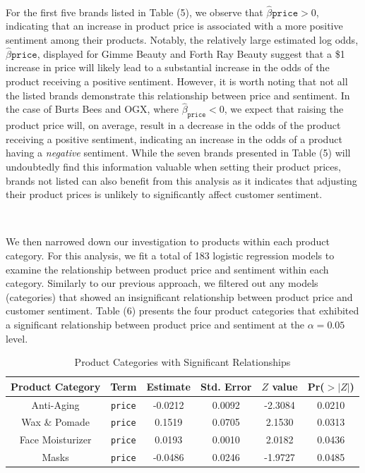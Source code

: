 \documentclass[10pt]{article}
\begin{document}
\

For the first five brands listed in Table (5), we observe that $\hat{\beta}{\texttt{price}}>0$, indicating that an increase in product price is associated with a more positive sentiment among their products. Notably, the relatively large estimated log odds, $\hat{\beta}{\texttt{price}}$, displayed for Gimme Beauty and Forth Ray Beauty suggest that a \$1 increase in price will likely lead to a substantial increase in the odds of the product receiving a positive sentiment. However, it is worth noting that not all the listed brands demonstrate this relationship between price and sentiment. In the case of Burts Bees and OGX, where $\hat{\beta}_{\texttt{price}}<0$, we expect that raising the product price will, on average, result in a decrease in the odds of the product receiving a positive sentiment, indicating an increase in the odds of a product having a \textit{negative} sentiment. While the seven brands presented in Table (5) will undoubtedly find this information valuable when setting their product prices, brands not listed can also benefit from this analysis as it indicates that adjusting their product prices is unlikely to significantly affect customer sentiment.

\

We then narrowed down our investigation to products within each product category. For this analysis, we fit a total of 183 logistic regression models to examine the relationship between product price and sentiment within each category. Similarly to our previous approach, we filtered out any models (categories) that showed an insignificant relationship between product price and customer sentiment. Table (6) presents the four product categories that exhibited a significant relationship between product price and sentiment at the $\alpha = 0.05$ level.

\begin{table}[h!]
    \centering
    \begin{tabular}{| c | c | c | c | c | c |} 
    \hline
    \textbf{Product Category} &  \textbf{Term} &  \textbf{Estimate} &  \textbf{Std. Error} &  \textbf{$Z$ value} &  \textbf{Pr($>|Z|$)} \\ 
    \hline
    \hline
    Anti-Aging & \texttt{price} & -0.0212 &	0.0092	& -2.3084 & 0.0210 \\
    \hline
    Wax \& Pomade & \texttt{price}	& 0.1519 & 0.0705 & 2.1530 & 0.0313 \\
    \hline
    Face Moisturizer & \texttt{price} & 0.0193 & 0.0010	& 2.0182 & 0.0436 \\
    \hline
    Masks & \texttt{price} & -0.0486 & 0.0246 & -1.9727 & 0.0485\\
    \hline
    \end{tabular}
    \caption{Product Categories with Significant Relationships}
\end{table}
\end{document}
